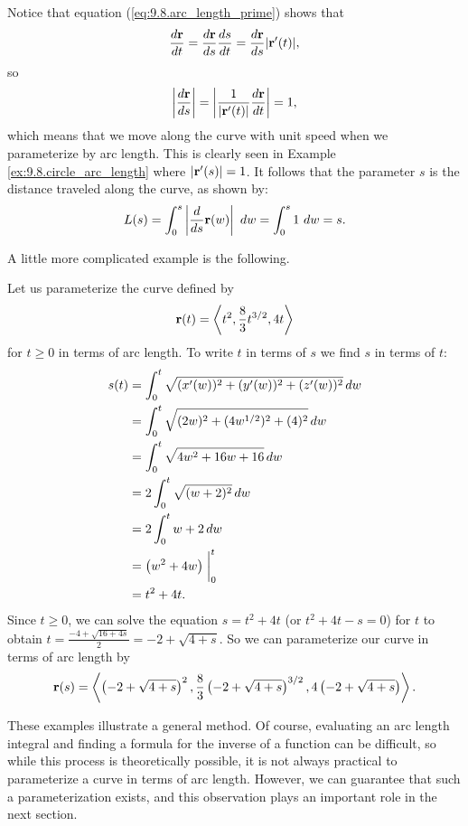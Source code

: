 Notice that equation (\ref{eq:9.8.arc_length_prime}) shows that 
\[\frac{d\mathbf{r}}{dt} = \frac{d\mathbf{r}}{ds}\frac{ds}{dt} = \frac{d\mathbf{r}}{ds}\lvert \mathbf{r}'(t) \rvert,\]
so
\[\left| \frac{d\mathbf{r}}{ds} \right| = \left|\frac{1}{\lvert \mathbf{r}'(t) \rvert}\frac{d\mathbf{r}}{dt} \right| = 1,\]
which means that we move along the curve with unit speed when we parameterize by arc length. This is clearly seen in Example \ref{ex:9.8.circle_arc_length} where $|\mathbf{r}'(s)| = 1$. It follows that the parameter $s$ 
is the distance traveled along the curve, as shown by:
$$
L(s) = \int_0^s\left|\frac{d}{ds}\mathbf{r}(w)\right|~dw = \int_0^s1~dw = s.
$$



A little more complicated example is the following.

\begin{example} \label{ex:9.8.AL_curvature_ex_2}  Let us parameterize the curve defined by
\[\mathbf{r}(t) = \left\langle t^2, \frac{8}{3}t^{3/2}, 4t \right\rangle\]
for $t \geq 0$ in terms of arc length. To write $t$ in terms of $s$ we find $s$ in terms of $t$:
\begin{align*}
s(t) &= \int_{0}^t \sqrt{(x'(w))^2 + (y'(w))^2 +(z'(w))^2} \, dw \\
    &= \int_0^t \sqrt{(2w)^2 + (4w^{1/2})^2 + (4)^2} \, dw \\
    &= \int_0^t \sqrt{4w^2 + 16w + 16} \, dw \\
    &= 2\int_0^t \sqrt{(w+2)^2} \, dw \\
    &= 2\int_0^t w+2 \, dw \\
    &= \left(w^2+4w\right)\biggm|_{0}^{t} \\
    &= t^2+4t.
\end{align*}
Since $t \geq 0$, we can solve the equation $s = t^2+4t$ (or $t^2+4t-s=0$) for $t$ to obtain $t = \frac{-4 +\sqrt{16+4s}}{2} = -2 + \sqrt{4+s}$. So we can parameterize our curve in terms of arc length by
\[\mathbf{r}(s) = \left\langle \left(-2 + \sqrt{4+s}\right)^2, \frac{8}{3}\left(-2 + \sqrt{4+s}\right)^{3/2}, 4\left(-2 + \sqrt{4+s}\right) \right\rangle.\]

\end{example}

These examples illustrate a general method.  Of course, evaluating an
arc length integral and finding a formula for the
inverse of a function can be difficult, so while this process is
theoretically possible, it is not always practical to parameterize a
curve in terms of arc length. However, we can guarantee that such a
parameterization exists, and this observation plays an important role
in the next section. 

